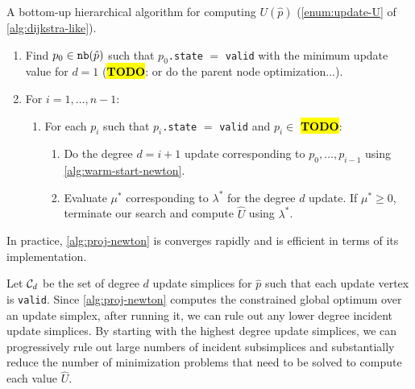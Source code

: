 \documentclass[eikonal.tex]{subfiles}
\begin{document}
\begin{algorithm}[H]
  \caption{A bottom-up hierarchical algorithm for computing
    $U(\hat{p})$ (\cref{enum:update-U} of
    \cref{alg:dijkstra-like}).}\label{alg:bottom-up}
  \begin{enumerate}[nolistsep]
  \item Find $p_0 \in \texttt{nb}(\hat{p})$ such that $p_0$\texttt{.state}
    $=$ \texttt{valid} with the minimum update value for $d = 1$
    (\hl{\textbf{TODO}}: or do the parent node optimization...).
  \item For $i = 1, \hdots, n - 1$:
    \begin{enumerate}
    \item For each $p_i$ such that $p_i$\texttt{.state} $=$
      \texttt{valid} and $p_i \in$ \hl{\textbf{TODO}}:
      \begin{enumerate}
      \item Do the degree $d = i + 1$ update corresponding to
        $p_0, \hdots, p_{i-1}$ using \cref{alg:warm-start-newton}.
      \item Evaluate $\mu^*$ corresponding to $\lambda^*$ for the
        degree $d$ update. If $\mu^* \geq 0$, terminate our search and
        compute $\hat{U}$ using $\lambda^*$.
      \end{enumerate}
    \end{enumerate}
  \end{enumerate}
\end{algorithm}

In practice, \cref{alg:proj-newton} is converges rapidly and is
efficient in terms of its implementation.

Let $\mathcal{C}_d$ be the set of degree $d$ update simplices for $\hat{p}$
such that each update vertex is \texttt{valid}. Since
\cref{alg:proj-newton} computes the constrained global optimum over an
update simplex, after running it, we can rule out any lower degree
incident update simplices. By starting with the highest degree update
simplices, we can progressively rule out large numbers of incident
subsimplices and substantially reduce the number of minimization
problems that need to be solved to compute each value $\hat{U}$.
\end{document}
